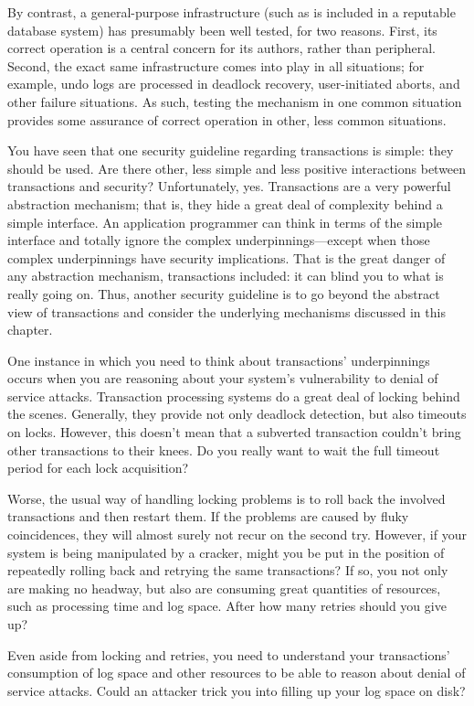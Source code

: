 By contrast, a general-purpose infrastructure (such as is included in
a reputable database system) has presumably been well tested, for two
reasons.  First, its correct operation is a central concern for its
authors, rather than peripheral.  Second, the exact same
infrastructure comes into play in all situations; for example, undo
logs are processed in deadlock recovery, user-initiated aborts, and
other failure situations.  As such, testing the mechanism in one
common situation provides some assurance of correct operation in
other, less common situations.

You have seen that one security guideline regarding transactions is simple:
they should be used.  Are there other, less simple and less positive interactions
between transactions and security?  Unfortunately, yes.  Transactions
are a very powerful abstraction mechanism; that is, they hide a great
deal of complexity behind a simple interface.  An application
programmer can think in terms of the simple interface and totally
ignore the complex underpinnings---except when those complex
underpinnings have security implications.  That is the great danger of
any abstraction mechanism, transactions included: it can blind you to
what is really going on.  Thus, another security guideline is to go beyond the
abstract view of transactions and consider the underlying mechanisms
discussed in this chapter.

One instance in which you need to think about transactions' underpinnings
occurs when you are reasoning about your system's vulnerability to denial of
service attacks.  Transaction processing systems do a great deal of
locking behind the scenes.  Generally, they provide not only deadlock
detection, but also timeouts on locks.  However, this doesn't mean
that a subverted transaction couldn't bring other transactions to
their knees.  Do you really want to wait the full timeout period for
each lock acquisition?

Worse, the usual way of handling locking
problems is to roll back the involved transactions and then restart
them. If the problems are caused by fluky coincidences, they will
almost surely not recur on the second try.  However, if your system is
being manipulated by a cracker, might you be put in the position of
repeatedly rolling back and retrying the same transactions?  If so,
you not only are making no headway, but also are consuming great
quantities of resources, such as processing time and log space.  After
how many retries should you give up?

Even aside from locking and
retries, you need to understand your transactions' consumption of log
space and other resources to be able to reason about denial of service
attacks.  Could an attacker trick you into filling up your log space
on disk?

